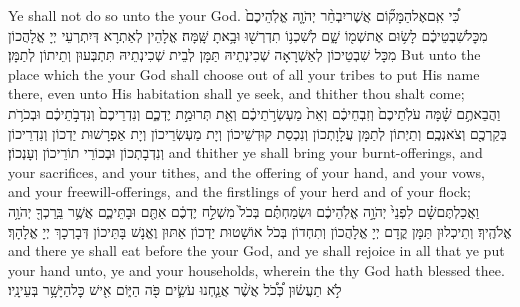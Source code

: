 {Ye shall not do so unto the \lord\space your God.}{}
{כִּ֠י אִֽם\maqqaf אֶל\maqqaf הַמָּק֞וֹם אֲשֶׁר\maqqaf יִבְחַ֨ר יְהֹוָ֤ה אֱלֹֽהֵיכֶם֙ מִכׇּל\maqqaf שִׁבְטֵיכֶ֔ם לָשׂ֥וּם אֶת\maqqaf שְׁמ֖וֹ שָׁ֑ם לְשִׁכְנ֥וֹ תִדְרְשׁ֖וּ וּבָ֥אתָ שָּֽׁמָּה׃}
{אֱלָהֵין לְאַתְרָא דְּיִתְרְעֵי יְיָ אֱלָהֲכוֹן מִכָּל שִׁבְטֵיכוֹן לְאַשְׁרָאָה שְׁכִינְתֵיהּ תַּמָּן לְבֵית שְׁכִינְתֵיהּ תִּתְבְּעוּן וְתֵיתוֹן לְתַמָּן׃}
{But unto the place which the \lord\space your God shall choose out of all your tribes to put His name there, even unto His habitation shall ye seek, and thither thou shalt come;}{}
{וַהֲבֵאתֶ֣ם שָׁ֗מָּה עֹלֹֽתֵיכֶם֙ וְזִבְחֵיכֶ֔ם וְאֵת֙ מַעְשְׂרֹ֣תֵיכֶ֔ם וְאֵ֖ת תְּרוּמַ֣ת יֶדְכֶ֑ם וְנִדְרֵיכֶם֙ וְנִדְבֹ֣תֵיכֶ֔ם וּבְכֹרֹ֥ת בְּקַרְכֶ֖ם וְצֹאנְכֶֽם׃}
{וְתַיְתוֹן לְתַמָּן עֲלָוָתְכוֹן וְנִכְסַת קוּדְשֵׁיכוֹן וְיָת מַעְשְׂרֵיכוֹן וְיָת אַפְרָשׁוּת יַדְכוֹן וְנִדְרֵיכוֹן וְנִדְבָתְכוֹן וּבְכוֹרֵי תוֹרֵיכוֹן וְעָנְכוֹן׃}
{and thither ye shall bring your burnt-offerings, and your sacrifices, and your tithes, and the offering of your hand, and your vows, and your freewill-offerings, and the firstlings of your herd and of your flock;}{}
{וַאֲכַלְתֶּם\maqqaf שָׁ֗ם לִפְנֵי֙ יְהֹוָ֣ה אֱלֹֽהֵיכֶ֔ם וּשְׂמַחְתֶּ֗ם בְּכֹל֙ מִשְׁלַ֣ח יֶדְכֶ֔ם אַתֶּ֖ם וּבָתֵּיכֶ֑ם אֲשֶׁ֥ר בֵּֽרַכְךָ֖ יְהֹוָ֥ה אֱלֹהֶֽיךָ׃}
{וְתֵיכְלוּן תַּמָּן קֳדָם יְיָ אֱלָהֲכוֹן וְתִחְדוֹן בְּכֹל אוֹשָׁטוּת יַדְכוֹן אַתּוּן וֶאֱנָשׁ בָּתֵּיכוֹן דְּבָרְכָךְ יְיָ אֱלָהָךְ׃}
{and there ye shall eat before the \lord\space your God, and ye shall rejoice in all that ye put your hand unto, ye and your households, wherein the \lord\space thy God hath blessed thee.}{}
{לֹ֣א תַעֲשׂ֔וּן כְּ֠כֹ֠ל אֲשֶׁ֨ר אֲנַ֧חְנוּ עֹשִׂ֛ים פֹּ֖ה הַיּ֑וֹם אִ֖ישׁ כׇּל\maqqaf הַיָּשָׁ֥ר בְּעֵינָֽיו׃}
